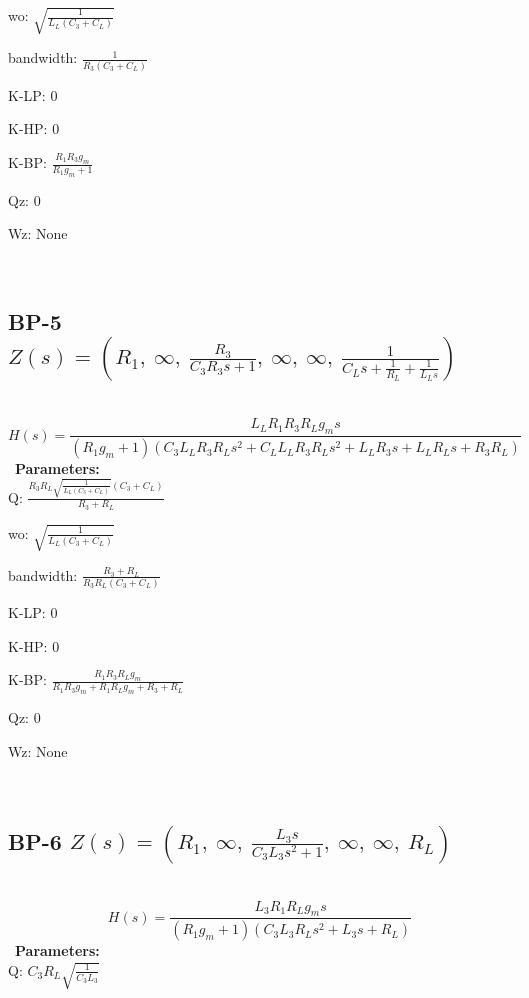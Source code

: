 \documentclass{article}
\begin{document}
wo: $\sqrt{\frac{1}{L_{L} \left(C_{3} + C_{L}\right)}}$\ 

bandwidth: $\frac{1}{R_{3} \left(C_{3} + C_{L}\right)}$\ 

K-LP: $0$\ 

K-HP: $0$\ 

K-BP: $\frac{R_{1} R_{3} g_{m}}{R_{1} g_{m} + 1}$\ 

Qz: $0$\ 

Wz: $\text{None}$\ 

\ 

\subsection{BP-5 $Z(s) = \left( R_{1}, \  \infty, \  \frac{R_{3}}{C_{3} R_{3} s + 1}, \  \infty, \  \infty, \  \frac{1}{C_{L} s + \frac{1}{R_{L}} + \frac{1}{L_{L} s}}\right)$ } \ 
\textbf{\[H(s) = \frac{L_{L} R_{1} R_{3} R_{L} g_{m} s}{\left(R_{1} g_{m} + 1\right) \left(C_{3} L_{L} R_{3} R_{L} s^{2} + C_{L} L_{L} R_{3} R_{L} s^{2} + L_{L} R_{3} s + L_{L} R_{L} s + R_{3} R_{L}\right)}\] } \ 
\textbf{Parameters:}\\ 

Q: $\frac{R_{3} R_{L} \sqrt{\frac{1}{L_{L} \left(C_{3} + C_{L}\right)}} \left(C_{3} + C_{L}\right)}{R_{3} + R_{L}}$\ 

wo: $\sqrt{\frac{1}{L_{L} \left(C_{3} + C_{L}\right)}}$\ 

bandwidth: $\frac{R_{3} + R_{L}}{R_{3} R_{L} \left(C_{3} + C_{L}\right)}$\ 

K-LP: $0$\ 

K-HP: $0$\ 

K-BP: $\frac{R_{1} R_{3} R_{L} g_{m}}{R_{1} R_{3} g_{m} + R_{1} R_{L} g_{m} + R_{3} + R_{L}}$\ 

Qz: $0$\ 

Wz: $\text{None}$\ 

\ 

\subsection{BP-6 $Z(s) = \left( R_{1}, \  \infty, \  \frac{L_{3} s}{C_{3} L_{3} s^{2} + 1}, \  \infty, \  \infty, \  R_{L}\right)$ } \ 
\textbf{\[H(s) = \frac{L_{3} R_{1} R_{L} g_{m} s}{\left(R_{1} g_{m} + 1\right) \left(C_{3} L_{3} R_{L} s^{2} + L_{3} s + R_{L}\right)}\] } \ 
\textbf{Parameters:}\\ 

Q: $C_{3} R_{L} \sqrt{\frac{1}{C_{3} L_{3}}}$\ 
\end{document}
